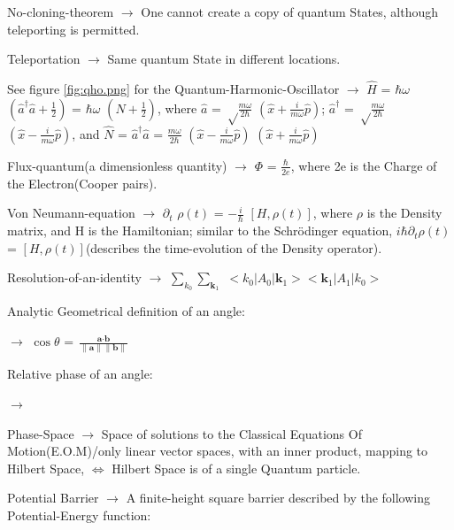 \documentclass[a4paper, 10pt, onepage]{elegantbook}
\begin{document}
{No-cloning-theorem $\longrightarrow$ One cannot create a copy of quantum States, although 
teleporting is permitted.  
  
Teleportation $\longrightarrow$ Same quantum State in different locations.  

See figure \ref{fig:qho.png} for the Quantum-Harmonic-Oscillator $\longrightarrow$  
\noindent
$\hat H$ = $\hbar \omega$  $\left(\hat {a}^\dagger \hat {a} + \frac{1}{2} \right)$ = $\hbar \omega$ $\left(\hat N + 
\frac{1}{2} \right)$, where $\hat {a}$ = ${\sqrt \frac{m \omega}{2 \hbar}}$ $\left( \hat x + \frac{i}{m \omega} \hat p 
\right)$; 
$\hat {a}^\dagger$ = ${\sqrt \frac{m \omega}{2 \hbar}}$ $\left( \hat x - \frac{i}{m \omega} \hat p \right)$, and  
$\hat N$ = $\hat {a}^\dagger \hat a$ = $\frac{m \omega}{2 \hbar}$ $\left(\hat x - \frac{i}{m \omega} \hat p \right)$ $ 
\left( \hat x + \frac{i}{m \omega} \hat p \right)$  
 
Flux-quantum(a dimensionless quantity) $\longrightarrow$ $\Phi$ = $\frac{\hbar}{2e}$, where 2e is 
the Charge of the Electron(Cooper pairs). 
     
Von Neumann-equation $\longrightarrow$ $\partial_t$ $\rho(t)$ = $- {\frac{i}{\hbar}}$ 
$[H,\rho(t)]$, where $\rho$ is the Density matrix, and H is the Hamiltonian;
similar to the Schr\"odinger equation, $i\hbar \partial_t \rho(t)$ = $[H, \rho(t)]$(describes the 
time-evolution of the Density operator).  
  
Resolution-of-an-identity $\longrightarrow$ $\sum_{k_0} \sum_{\mathbf k_1}$ $<k_0|A_0| 
{\mathbf k_1}><{\mathbf k_1}|A_1|k_0>$ 

Analytic Geometrical definition of an angle:  

$\longrightarrow$ $\cos \theta$ = $\frac{\textbf{a} \cdot \textbf{b}}{\lVert \textbf{a} \rVert \lVert \textbf{b} 
\rVert}$

Relative phase of an angle:

$\longrightarrow$

Phase-Space $\longrightarrow$ Space of solutions to the Classical Equations Of Motion(E.O.M)/only linear vector spaces, 
with an inner product, mapping to Hilbert Space, $\iff$ Hilbert Space is of a single Quantum particle.

Potential Barrier $\longrightarrow$ A finite-height square barrier described by the following 
Potential-Energy function:  

}
\end{document}
